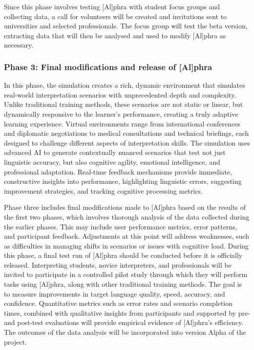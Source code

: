 \documentclass[output=paper]{langscibook}
\begin{document}
Since this phase involves testing [Al]phra with student focus groups and collecting data, a call for volunteers will be created and invitations sent to universities and selected professionals. The focus group will test the beta version, extracting data that will then be analysed and used to modify [Al]phra as necessary. 

\subsubsection{Phase 3: Final modifications and release of [Al]phra}

In this phase, the simulation creates a rich, dynamic environment that simulates real-world interpretation scenarios with unprecedented depth and complexity. Unlike traditional training methods, these scenarios are not static or linear, but dynamically responsive to the learner's performance, creating a truly adaptive learning experience. Virtual environments range from international conferences and diplomatic negotiations to medical consultations and technical briefings, each designed to challenge different aspects of interpretation skills. The simulation uses advanced AI to generate contextually nuanced scenarios that test not just linguistic accuracy, but also cognitive agility, emotional intelligence, and professional adaptation. Real-time feedback mechanisms provide immediate, constructive insights into performance, highlighting linguistic errors, suggesting improvement strategies, and tracking cognitive processing metrics. 

Phase three includes final modifications made to [Al]phra based on the results of the first two phases, which involves thorough analysis of the data collected during the earlier phases. This may include user performance metrics, error patterns, and participant feedback. Adjustments at this point will address weaknesses, such as difficulties in managing shifts in scenarios or issues with cognitive load. During this phase, a final test run of [Al]phra should be conducted before it is officially released. Interpreting students, novice interpreters, and professionals will be invited to participate in a controlled pilot study through which they will perform tasks using [Al]phra, along with other traditional training methods. The goal is to measure improvements in target language quality, speed, accuracy, and confidence. Quantitative metrics such as error rates and scenario completion times, combined with qualitative insights from participants and supported by pre- and post-test evaluations will provide empirical evidence of [Al]phra’s efficiency. The outcomes of the data analysis will be incorporated into version Alpha of the project. 
\end{document}
